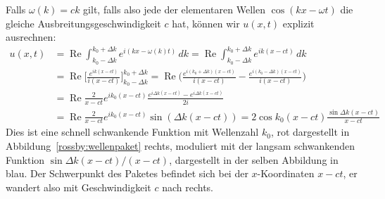 Falls $\omega(k)=ck$ gilt, falls also jede der elementaren Wellen
$\cos(kx-\omega t)$ die gleiche
Ausbreitungsgeschwindigkeit $c$ hat, können wir $u(x,t)$ explizit
ausrechnen:
\begin{align*}
u(x,t)
&=
\operatorname{Re}
\int_{k_0-\Delta k}^{k_0+\Delta k}
e^{i(kx-\omega(k)t)}\,dk
=
\operatorname{Re}
\int_{k_0-\Delta k}^{k_0+\Delta k}
e^{ik(x-ct)}\,dk
\\
&=
\operatorname{Re}
\biggl[
\frac{e^{ik(x-ct)}}{i(x-ct)}
\biggr]_{k_0-\Delta k}^{k_0+\Delta k}
=
\operatorname{Re}
\biggl(
\frac{e^{i(k_0+\Delta k)(x-ct)}}{i(x-ct)}
-
\frac{e^{i(k_0-\Delta k)(x-ct)}}{i(x-ct)}
\biggr)
\\
&=
\operatorname{Re}\frac{2}{x-ct}
e^{ik_0(x-ct)}\frac{e^{i\Delta k(x-ct)}-e^{i\Delta k(x-ct)}}{2i}
\\
&=
\operatorname{Re}\frac{2}{x-ct}
e^{ik_0(x-ct)}
\sin (\Delta k(x-ct))
=
2\cos k_0(x-ct) \frac{\sin \Delta k(x-ct)}{x-ct}
\end{align*}
Dies ist eine schnell schwankende Funktion mit Wellenzahl $k_0$, rot
dargestellt in Abbildung~\ref{rossby:wellenpaket} rechts, moduliert
mit der langsam schwankenden Funktion $\sin\Delta k(x-ct)/(x-ct)$,
dargestellt in der selben Abbildung in blau.
Der Schwerpunkt des Paketes befindet sich bei der $x$-Koordinaten $x-ct$,
er wandert also mit Geschwindigkeit $c$ nach rechts.

